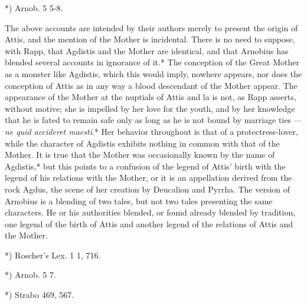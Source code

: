 \documentclass[a4paper, 11pt, oneside, polutonikogreek, english]{article}
\begin{document}
*) Arnob. 5 5-8.

The above accounts are intended by their authors merely to present the origin of Attis, and the mention of the Mother is incidental. There is no need to suppose, with Rapp, that Agdistis and the Mother are identical, and that Arnobius has blended several accounts in ignorance of it.* The conception of the Great Mother as a monster like Agdistis, which this would imply, nowhere appears, nor does the conception of Attis as in any way a blood descendant of the Mother appear. The appearance of the Mother at the nuptials of Attis and la is not, as Rapp asserts, without motive; she is impelled by her love for the youth, and by her knowledge that he is fated to remain safe only as long as he is not bound by marriage ties --- \emph{ne quid accideret maesti}.* Her behavior throughout is that of a protectress-lover, while the character of Agdistis exhibits nothing in common with that of the Mother. It is true that the Mother was occasionally known by the name of Agdistis,* but this points to a confusion of the legend of Attis' birth with the legend of his relations with the Mother, or it is an appellation derived from the rock Agdus, the scene of her creation by Deucalion and Pyrrha. The version of Arnobius is a blending of two tales, but not two tales presenting the same characters. He or his authorities blended, or found already blended by tradition, one legend of the birth of Attis and another legend of the relations of Attis and the Mother.

*) Roscher's Lex. 1 1, 716.

*) Arnob. 5 7.

*) Strabo 469, 567.
\end{document}
